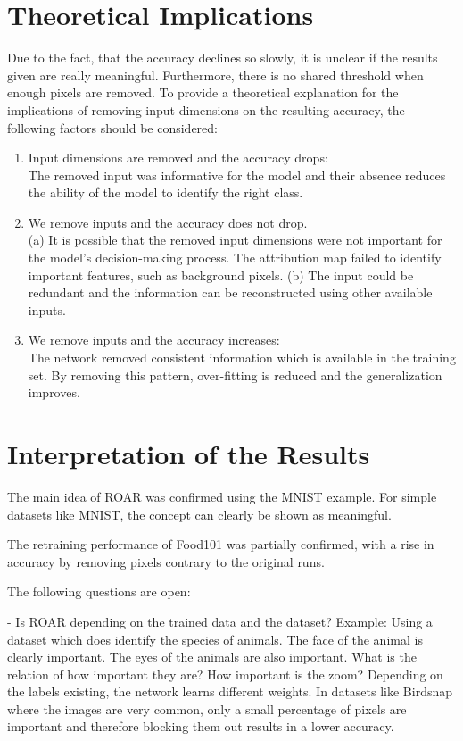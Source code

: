 \section{Theoretical Implications}

Due to the fact, that the accuracy declines so slowly, it is unclear if the results given are really meaningful. Furthermore, there is no shared threshold when enough pixels are removed.
To provide a theoretical explanation for the implications of removing input dimensions on the resulting accuracy, the following factors should be considered:

\begin{enumerate}
	\item Input dimensions are removed and the accuracy drops:\\ The removed input was informative for the model and
	their absence reduces the ability of the model to identify the right class.
	
	\item We remove inputs and the accuracy does not drop.\\ (a) It is possible that the removed input dimensions	were not important for the model’s decision-making	process. The attribution map failed to identify important features, such as background pixels. (b) The input could be redundant and the information can be reconstructed using other available inputs. 
	
	\item We remove inputs and the accuracy increases:\\ The network removed consistent information which is available in the training set. By removing this pattern, over-fitting is reduced and the generalization improves.
\end{enumerate}

\section{Interpretation of the Results}

The main idea of ROAR was confirmed using the MNIST example. For simple datasets like MNIST, the concept can clearly be shown as meaningful.

The retraining performance of Food101 was partially confirmed, with a rise in accuracy by removing pixels contrary to the original runs.


The following questions are open:

- Is ROAR depending on the trained data and the dataset? Example: Using a dataset which does identify the species of animals. The face of the animal is clearly important. The eyes of the animals are also important. What is the relation of how important they are? How important is the zoom? Depending on the labels existing, the network learns different weights. In datasets like Birdsnap where the images are very common, only a small percentage of pixels are important and therefore blocking them out results in a lower accuracy.


